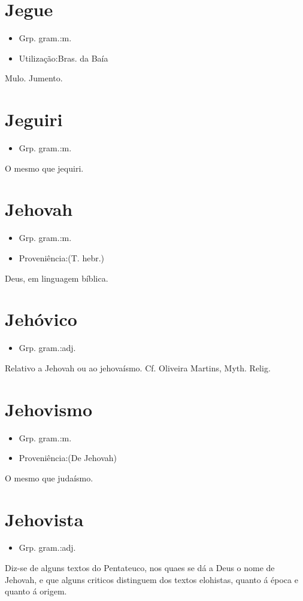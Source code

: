 \documentclass{article}
\begin{document}
\section{Jegue}
\begin{itemize}
\item {Grp. gram.:m.}
\end{itemize}
\begin{itemize}
\item {Utilização:Bras. da Baía}
\end{itemize}
Mulo.
Jumento.
\section{Jeguiri}
\begin{itemize}
\item {Grp. gram.:m.}
\end{itemize}
O mesmo que \textunderscore jequiri\textunderscore .
\section{Jehovah}
\begin{itemize}
\item {Grp. gram.:m.}
\end{itemize}
\begin{itemize}
\item {Proveniência:(T. hebr.)}
\end{itemize}
Deus, em linguagem bíblica.
\section{Jehóvico}
\begin{itemize}
\item {Grp. gram.:adj.}
\end{itemize}
Relativo a Jehovah ou ao jehovaísmo. Cf. Oliveira Martins, \textunderscore Myth. Relig.\textunderscore 
\section{Jehovismo}
\begin{itemize}
\item {Grp. gram.:m.}
\end{itemize}
\begin{itemize}
\item {Proveniência:(De \textunderscore Jehovah\textunderscore )}
\end{itemize}
O mesmo que \textunderscore judaísmo\textunderscore .
\section{Jehovista}
\begin{itemize}
\item {Grp. gram.:adj.}
\end{itemize}
Diz-se de alguns textos do \textunderscore Pentateuco\textunderscore , nos quaes se dá a Deus o nome de \textunderscore Jehovah\textunderscore , e que alguns criticos distinguem dos textos elohistas, quanto á época e quanto á origem.
\end{document}
